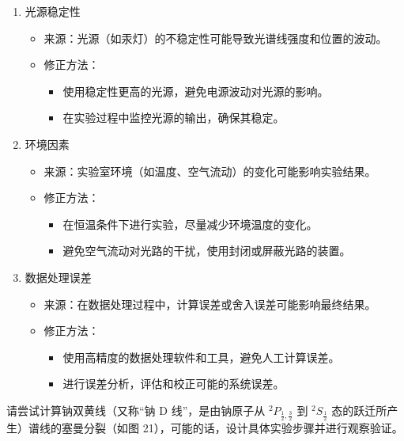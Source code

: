 \documentclass[dvipsnames, svgnames,a4paper,11pt]{article}
\begin{document}
\begin{enumerate}
\begin{enumerate}
			\item 光源稳定性
			\begin{itemize}
				\item 来源：光源（如汞灯）的不稳定性可能导致光谱线强度和位置的波动。
				\item 修正方法：
				\begin{itemize}
					\item 使用稳定性更高的光源，避免电源波动对光源的影响。
					\item 在实验过程中监控光源的输出，确保其稳定。
				\end{itemize}
			\end{itemize}
			
			\item 环境因素
			\begin{itemize}
				\item 来源：实验室环境（如温度、空气流动）的变化可能影响实验结果。
				\item 修正方法：
				\begin{itemize}
					\item 在恒温条件下进行实验，尽量减少环境温度的变化。
					\item 避免空气流动对光路的干扰，使用封闭或屏蔽光路的装置。
				\end{itemize}
			\end{itemize}
			
			\item 数据处理误差
			\begin{itemize}
				\item 来源：在数据处理过程中，计算误差或舍入误差可能影响最终结果。
				\item 修正方法：
				\begin{itemize}
					\item 使用高精度的数据处理软件和工具，避免人工计算误差。
					\item 进行误差分析，评估和校正可能的系统误差。
				\end{itemize}
			\end{itemize}
		\end{enumerate}
	\end{enumerate}
	
	
	\begin{question}
		请尝试计算钠双黄线（又称“钠 D 线”，是由钠原子从 $^2P_{\frac{1}{2}, \frac{3}{2}}$ 到 $^2S_{\frac{1}{2}}$ 态的跃迁所产生）谱线的塞曼分裂（如图 21），可能的话，设计具体实验步骤并进行观察验证。
	\end{question}
	
\end{document}
